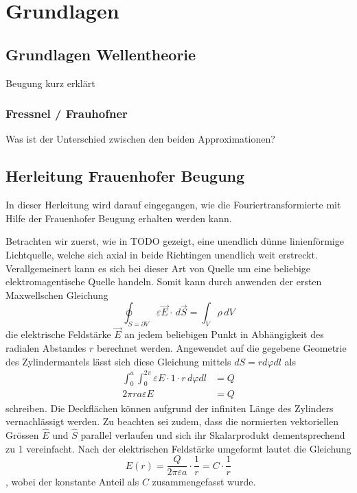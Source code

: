 %
%
%
%
\section{Grundlagen\label{opt:section:grundlagen}}

\subsection{Grundlagen Wellentheorie}
Beugung kurz erklärt

\subsubsection{Fressnel / Frauhofner}
Was ist der Unterschied zwischen den beiden Approximationen?

\subsection{Herleitung Frauenhofer Beugung}
In dieser Herleitung wird darauf eingegangen, wie die Fouriertransformierte mit Hilfe der Frauenhofer Beugung erhalten werden kann.

Betrachten wir zuerst, wie in TODO gezeigt, eine unendlich dünne linienförmige Lichtquelle, welche sich axial in beide Richtingen unendlich weit erstreckt.
Verallgemeinert kann es sich bei dieser Art von Quelle um eine beliebige elektromagentische Quelle handeln.
Somit kann durch anwenden der ersten Maxwellschen Gleichung
\begin{equation}
\oint_{S=\partial V} \varepsilon\vec{E} \cdot\, d\vec{S}
=
\int_{V}\rho\, dV
\end{equation}
die elektrische Feldstärke $\vec{E}$ an jedem beliebigen Punkt in Abhängigkeit des radialen Abstandes $r$ berechnet werden.
Angewendet auf die gegebene Geometrie des Zylindermantels lässt sich diese Gleichung mittels $dS = r d\varphi dl$ als
\begin{align}
\int_{0}^{a}\int_{0}^{2\pi} \varepsilon E\cdot 1 \cdot r\, d\varphi dl
&=
Q
\\
2\pi ra\varepsilon E
&=
Q
\end{align}
schreiben.
Die Deckflächen können aufgrund der infiniten Länge des Zylinders vernachlässigt werden.
Zu beachten sei zudem, dass die normierten vektoriellen Grössen $\hat{E}$ und $\hat{S}$ parallel verlaufen und sich ihr Skalarprodukt dementsprechend zu 1 vereinfacht.
Nach der elektrischen Feldstärke umgeformt lautet die Gleichung
\begin{equation}
E(r)
=
\frac{Q}{2\pi\varepsilon a} \cdot \frac{1}{r}
=
C \cdot \frac{1}{r}
\label{opt:equation:E}
\end{equation}
, wobei der konstante Anteil als $C$ zusammengefasst wurde.


